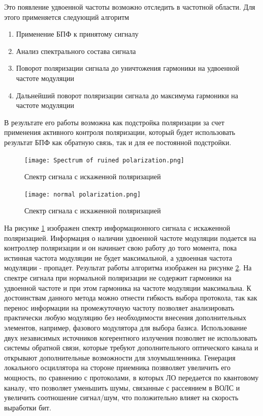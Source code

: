 Это появление удвоенной частоты возможно отследить в частотной области. Для этого применяется следующий алгоритм 
\begin{enumerate}
    \item Применение БПФ к принятому сигналу
    \item Анализ спектрального состава сигнала
    \item Поворот поляризации сигнала до уничтожения гармоники на удвоенной частоте модуляции
    \item Дальнейший поворот поляризации сигнала до максимума гармоники на частоте модуляции
\end{enumerate}
В результате его работы возможна как подстройка поляризации за счет применения активного контроля поляризации, который будет использовать результат БПФ как обратную связь, так и для ее постоянной подстройки. 
\begin{figure}
    \centering
    \texttt{[image: Spectrum of ruined polarization.png]}
    \caption{Спектр сигнала с искаженной поляризацией}
    \label{fig:ref ruin pol}
\end{figure}
\begin{figure}
    \centering
    \texttt{[image: normal polarization.png]}
    \caption{Спектр сигнала с искаженной поляризацией}
    \label{fig:ref norm pol}
\end{figure}
На рисунке \ref{fig:ref ruin pol} изображен спектр информационного сигнала с искаженной поляризацией. Информация о наличии удвоенной частоте модуляции подается на контроллер поляризации и он начинает свою работу до того момента, пока истинная частота модуляции не будет максимальной, а удвоенная частота модуляции - пропадет. Результат работы алгоритма изображен на рисунке \ref{fig:ref norm pol}. На спектре сигнала при нормальной поляризации не содержит гармоники на удвоенной частоте и при этом гармоника на частоте модуляции максимальна.
\newline К достоинствам данного метода можно отнести гибкость выбора протокола, так как перенос информации на промежуточную частоту позволяет анализировать практически любую модуляцию без необходимости внесения дополнительных элементов, например, фазового модулятора для выбора базиса. Использование двух независимых источников когерентного излучения позволяет не использовать системы обратной связи, которые требуют дополнительного оптического канала и открывают дополнительные возможности для злоумышленника. Генерация локального осциллятора на стороне приемника позвволяет увеличить его мощность, по сравнению с протоколами, в которых ЛО передается по квантовому каналу, что позволяет уменьшить шумы, связанные с рассеянием в ВОЛС и увеличить соотношение сигнал/шум, что положительно влияет на скорость выработки бит. 

